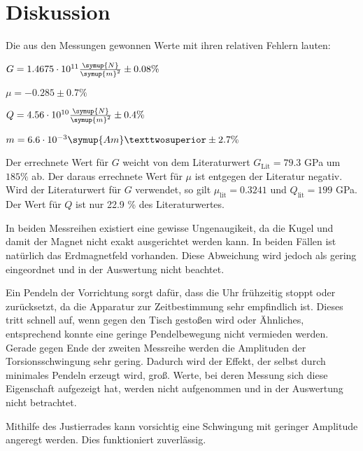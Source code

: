 \section{Diskussion}
\label{sec:Diskussion}

Die aus den Messungen gewonnen Werte mit ihren relativen Fehlern lauten:

\vspace{0.5em}
\centerline{$G = 1.4675 \cdot 10^{11} \frac{\symup{N}}{\symup{m}^2} \pm 0.08 \%$}

\vspace{0.4em}

\centerline{$\mu = -0.285 \pm 0.7\%$}

\vspace{0.4em}

\centerline{$Q = 4.56 \cdot 10^{10} \frac{\symup{N}}{\symup{m}^2} \pm 0.4 \%$}

\vspace{0.4em}

\centerline{$m = 6.6 \cdot 10^{-3} \symup{Am}² \pm 2.7 \%$}
\vspace{0.5em}

Der errechnete Wert für $G$ weicht von dem Literaturwert $G_\text{Lit} = 79.3$ GPa \cite{G-stahl} um $185 \%$ ab.
Der daraus errechnete Wert für $\mu$ ist entgegen der Literatur negativ.
Wird der Literaturwert für $G$ verwendet, so gilt $\mu_\text{lit} = 0.3241$ und $Q_\text{lit} = 199$ GPa.
Der Wert für $Q$ ist nur 22.9 \% des Literaturwertes.

In beiden Messreihen existiert eine gewisse Ungenaugikeit, da die Kugel und damit der Magnet nicht exakt ausgerichtet werden kann.
In beiden Fällen ist natürlich das Erdmagnetfeld vorhanden. Diese Abweichung wird jedoch als gering eingeordnet und in der Auswertung nicht beachtet.

Ein Pendeln der Vorrichtung sorgt dafür, dass die Uhr frühzeitig stoppt oder zurücksetzt, da die Apparatur zur Zeitbestimmung sehr empfindlich ist. Dieses tritt schnell auf, wenn gegen den Tisch gestoßen wird oder Ähnliches, entsprechend konnte eine geringe Pendelbewegung nicht vermieden werden.
Gerade gegen Ende der zweiten Messreihe werden die Amplituden der Torsionsschwingung sehr gering. Dadurch wird der Effekt, der selbst durch minimales Pendeln erzeugt wird, groß.
Werte, bei deren Messung sich diese Eigenschaft aufgezeigt hat, werden nicht aufgenommen und in der Auswertung nicht betrachtet.

Mithilfe des Justierrades kann vorsichtig eine Schwingung mit geringer Amplitude angeregt werden. Dies funktioniert zuverlässig.

